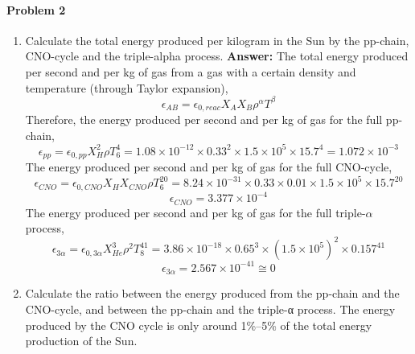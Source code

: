 \documentclass[11pt]{scrartcl}
\begin{document}
{\paragraph*{Problem 2}
\begin{enumerate}[label=(\alph*)]
\item Calculate the total energy produced per kilogram in the Sun by the pp-chain, CNO-cycle and the triple-alpha process.
\newline \textbf{Answer: }
\newline The total energy produced per second and per kg of gas from a gas
with a certain density and temperature (through Taylor expansion),
\begin{equation}
    \epsilon_{AB} = \epsilon_{0,reac}X_AX_B\rho^\alpha T^\beta
\end{equation}
Therefore, the energy produced per second and per kg of gas for the full pp-chain,
\begin{equation}
    \epsilon_{pp} = \epsilon_{0,pp}X^2_H\rho T^4_6 = 1.08 \times 10^{-12} \times 0.33^2 \times 1.5 \times 10^5 \times 15.7^4 = 1.072 \times 10^{-3}
\end{equation}
The energy produced per second and per kg of gas for the full CNO-cycle,
\begin{equation}
    \epsilon_{CNO} = \epsilon_{0,CNO}X_HX_{CNO}\rho T^{20}_6 = 8.24 \times 10^{-31} \times 0.33 \times 0.01 \times 1.5 \times 10^5 \times 15.7^{20}
\end{equation}
\begin{equation}
    \epsilon_{CNO} = 3.377 \times 10^{-4}
\end{equation}
The energy produced per second and per kg of gas for the full triple-$\alpha$ process,
\begin{equation}
    \epsilon_{3\alpha} = \epsilon_{0,3\alpha}X^3_{He}\rho^2 T^{41}_8 = 3.86 \times 10^{-18} \times 0.65^3 \times (1.5 \times 10^5)^2 \times 0.157^{41}
\end{equation}
\begin{equation}
    \epsilon_{3\alpha} = 2.567 \times 10^{-41} \cong 0
\end{equation}
\item Calculate the ratio between the energy produced from the pp-chain and the CNO-cycle, and between the pp-chain and the triple-α process. The energy produced by the CNO cycle is only around 1\%–5\% of the total energy
production of the Sun.


\end{enumerate}}
\end{document}
